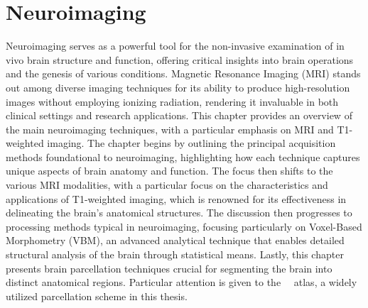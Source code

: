 \chapter{Neuroimaging}

Neuroimaging serves as a powerful tool for the non-invasive examination of in
vivo brain structure and function, offering critical insights into brain
operations and the genesis of various conditions. Magnetic Resonance Imaging
(MRI) stands out among diverse imaging techniques for its ability to produce
high-resolution images without employing ionizing radiation, rendering it
invaluable in both clinical settings and research applications. This chapter
provides an overview of the main neuroimaging techniques, with a particular
emphasis on MRI and T1-weighted imaging. The chapter begins by outlining the
principal acquisition methods foundational to neuroimaging, highlighting how
each technique captures unique aspects of brain anatomy and function. The focus
then shifts to the various MRI modalities, with a particular focus on the
characteristics and applications of T1-weighted imaging, which is renowned for
its effectiveness in delineating the brain's anatomical structures. The
discussion then progresses to processing methods typical in neuroimaging,
focusing particularly on Voxel-Based Morphometry (VBM), an advanced analytical
technique that enables detailed structural analysis of the brain through
statistical means. Lastly, this chapter presents brain parcellation techniques
crucial for segmenting the brain into distinct anatomical regions. Particular
attention is given to
the~\citeauthor{desikan_automated_2006}~\cite{desikan_automated_2006} atlas, a
widely utilized parcellation scheme in this thesis.

